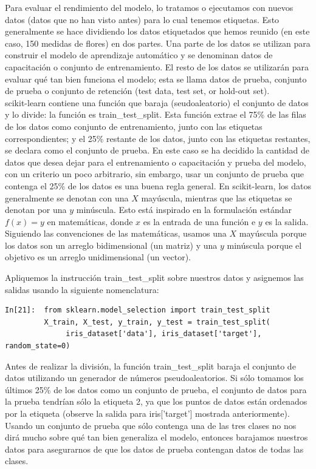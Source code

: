 Para evaluar el rendimiento del modelo, lo tratamos o ejecutamos con nuevos datos (datos que no han visto
antes) para lo cual tenemos etiquetas. Esto generalmente se hace dividiendo los datos etiquetados que
hemos reunido (en este caso,  150 medidas de flores) en dos partes. Una parte de los datos se utilizan para construir el modelo de aprendizaje automático y se denominan datos de capacitación o conjunto de entrenamiento. El resto de los datos se utilizarán para evaluar qué tan bien funciona el modelo; esta se llama datos de prueba, conjunto de prueba o conjunto de retención (test data, test set, or hold-out set).\\

scikit-learn contiene una función que baraja (seudoaleatorio) el conjunto de datos y lo divide: 
la función es {\ttfamily train\_test\_split}.  Esta función extrae el 75\% de las filas de los datos como
conjunto de entrenamiento, junto con las etiquetas correspondientes; y el 25\% restante
de los datos, junto con las etiquetas restantes, se declara como el conjunto de prueba. En este caso se ha decidido la cantidad de datos que desea dejar para el entrenamiento o capacitación  y  prueba del modelo,  con un criterio un poco arbitrario, sin embargo, usar un conjunto de prueba que contenga el 25\% de los datos es una buena regla general.   En scikit-learn, los datos generalmente se denotan con una $X$ mayúscula, mientras que las etiquetas se denotan por una $y$ minúscula. Esto está inspirado en la formulación estándar $f(x) = y$ en matemáticas, donde $x$ es la entrada de una función e $y$ es la salida. Siguiendo las convenciones de las matemáticas, usamos una $X$ mayúscula porque los datos son un arreglo bidimensional (un
matriz) y una $y$  minúscula  porque el objetivo es un arreglo unidimensional (un vector).


Apliquemos la instrucción {\ttfamily train\_test\_split} sobre nuestros datos y asignemos las salidas usando la siguiente  nomenclatura:\\

\begin{lstlisting}
In[21]:  from sklearn.model_selection import train_test_split
         X_train, X_test, y_train, y_test = train_test_split(
              iris_dataset['data'], iris_dataset['target'], random_state=0)

\end{lstlisting}


Antes de realizar la división, la función {\ttfamily train\_test\_split}  baraja el conjunto de datos utilizando un generador de números pseudoaleatorios. Si sólo tomamos los últimos 25\% de los datos como un conjunto de prueba, el conjunto de datos para la prueba  tendrían sólo la etiqueta 2, ya que los puntos de datos están ordenados por la etiqueta (observe la salida para  {\ttfamily iris['target']}  mostrada anteriormente). Usando un conjunto de prueba que sólo contenga una de las tres clases no nos dirá mucho sobre qué tan bien generaliza el modelo, entonces barajamos nuestros datos para asegurarnos de que los datos de prueba contengan datos de todas las clases.\\


